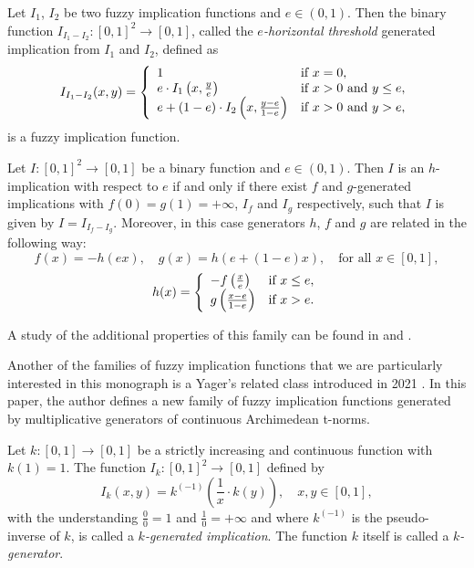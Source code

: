 \begin{theorem} Let $I_1$, $I_2$ be two fuzzy implication functions and $e \in (0,1)$. Then the binary function $I_{I_1-I_2}:[0,1]^2 \to [0,1]$, called the \emph{$e$-horizontal threshold} generated implication from $I_1$ and $I_2$, defined as
	$$I_{I_1-I_2}(x,y)=\left \{\begin{array}{ll} 1& \hbox{if } x=0,\\
		e \cdot I_1\left(x,\frac{y}{e}\right) &\hbox{if } x>0 \hbox{ and } y \leq e, \\
		e+(1-e)\cdot I_2\left(x,\frac{y-e}{1-e}\right) &\hbox{if } x>0 \hbox{ and } y > e,
	\end{array}\right.
	$$
	is a fuzzy implication function.
	\label{horizontalthreshold}
\end{theorem}

\begin{theorem}\label{th:characterizationh}
	Let $I:[0,1]^2 \to [0,1]$ be a binary function and $e \in (0,1)$. Then $I$ is an $h$-implication with respect to $e$ if and only if there exist $f$ and $g$-generated implications with $f(0)=g(1)=+\infty$, $I_f$ and $I_g$ respectively, such that $I$ is given by $I=I_{I_f-I_g}$. Moreover, in this case generators $h$, $f$ and $g$ are related in the following way:
	$$f(x)=-h(ex), \quad g(x)=h(e+(1-e)x), \quad \text{for all } x \in [0,1],$$
	$$
	h(x)=\left \{\begin{array}{ll} -f \left(\frac{x}{e}\right)& \hbox{if } x \leq e,\\
		g \left(\frac{x-e}{1-e}\right)&\hbox{if } x>e.
	\end{array}\right.
	$$
\end{theorem}

A study of the additional properties of this family can be found in \cite{Massanet2011A} and \cite[Section 5]{Hlinena2013}.

Another of the families of fuzzy implication functions that we are particularly interested in this monograph is a Yager's related class introduced in 2021 \cite{Zhou2021}. In this paper, the author defines a new family of fuzzy implication functions generated by multiplicative generators of continuous Archimedean t-norms. 

\begin{definition} 
	Let $k:[0,1]\to[0,1]$ be a strictly increasing and continuous function with $k(1)=1$. The function $I_k : [0,1]^2 \to [0,1]$ defined by
	$$I_k(x,y)=k^{(-1)}\left( \frac{1}{x} \cdot k(y)\right), \quad x,y\in[0,1],$$ 
	with the understanding $\frac{0}{0}=1$ and $\frac{1}{0}=+\infty$ and where $k^{(-1)}$ is the pseudo-inverse of $k$, is called a \emph{$k$-generated implication}. The function $k$ itself is called a \emph{$k$-generator}.
\end{definition}

